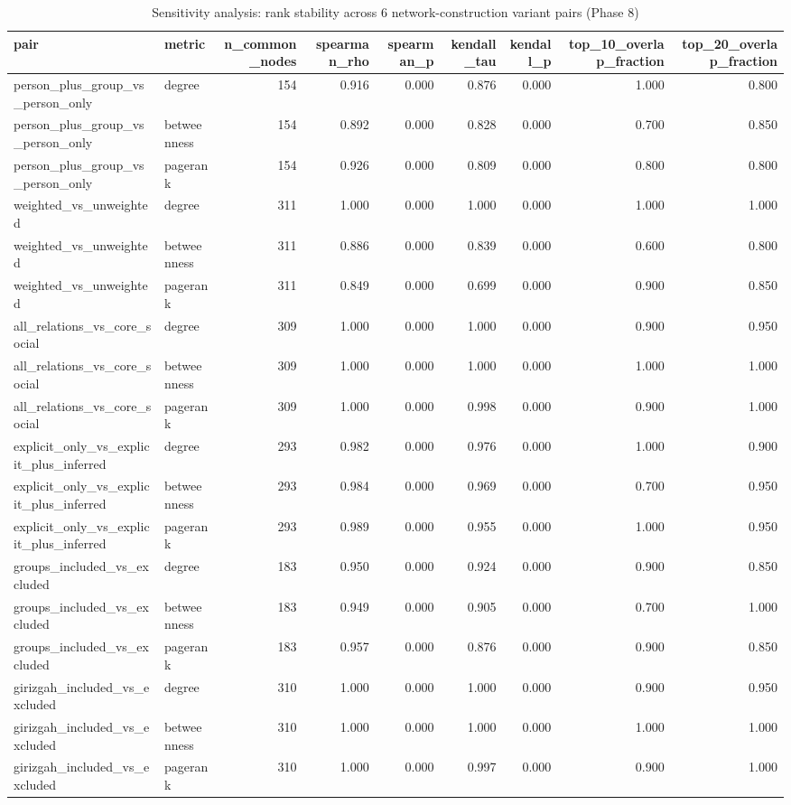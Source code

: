 \begin{table}
\caption{Sensitivity analysis: rank stability across 6 network-construction variant pairs (Phase 8)}
\label{tab:t10_sensitivity_analysis}
\begin{tabular}{llrrrrrrr}
\toprule
pair & metric & n_common_nodes & spearman_rho & spearman_p & kendall_tau & kendall_p & top_10_overlap_fraction & top_20_overlap_fraction \\
\midrule
person_plus_group_vs_person_only & degree & 154 & 0.916 & 0.000 & 0.876 & 0.000 & 1.000 & 0.800 \\
person_plus_group_vs_person_only & betweenness & 154 & 0.892 & 0.000 & 0.828 & 0.000 & 0.700 & 0.850 \\
person_plus_group_vs_person_only & pagerank & 154 & 0.926 & 0.000 & 0.809 & 0.000 & 0.800 & 0.800 \\
weighted_vs_unweighted & degree & 311 & 1.000 & 0.000 & 1.000 & 0.000 & 1.000 & 1.000 \\
weighted_vs_unweighted & betweenness & 311 & 0.886 & 0.000 & 0.839 & 0.000 & 0.600 & 0.800 \\
weighted_vs_unweighted & pagerank & 311 & 0.849 & 0.000 & 0.699 & 0.000 & 0.900 & 0.850 \\
all_relations_vs_core_social & degree & 309 & 1.000 & 0.000 & 1.000 & 0.000 & 0.900 & 0.950 \\
all_relations_vs_core_social & betweenness & 309 & 1.000 & 0.000 & 1.000 & 0.000 & 1.000 & 1.000 \\
all_relations_vs_core_social & pagerank & 309 & 1.000 & 0.000 & 0.998 & 0.000 & 0.900 & 1.000 \\
explicit_only_vs_explicit_plus_inferred & degree & 293 & 0.982 & 0.000 & 0.976 & 0.000 & 1.000 & 0.900 \\
explicit_only_vs_explicit_plus_inferred & betweenness & 293 & 0.984 & 0.000 & 0.969 & 0.000 & 0.700 & 0.950 \\
explicit_only_vs_explicit_plus_inferred & pagerank & 293 & 0.989 & 0.000 & 0.955 & 0.000 & 1.000 & 0.950 \\
groups_included_vs_excluded & degree & 183 & 0.950 & 0.000 & 0.924 & 0.000 & 0.900 & 0.850 \\
groups_included_vs_excluded & betweenness & 183 & 0.949 & 0.000 & 0.905 & 0.000 & 0.700 & 1.000 \\
groups_included_vs_excluded & pagerank & 183 & 0.957 & 0.000 & 0.876 & 0.000 & 0.900 & 0.850 \\
girizgah_included_vs_excluded & degree & 310 & 1.000 & 0.000 & 1.000 & 0.000 & 0.900 & 0.950 \\
girizgah_included_vs_excluded & betweenness & 310 & 1.000 & 0.000 & 1.000 & 0.000 & 1.000 & 1.000 \\
girizgah_included_vs_excluded & pagerank & 310 & 1.000 & 0.000 & 0.997 & 0.000 & 0.900 & 1.000 \\
\bottomrule
\end{tabular}
\end{table}
